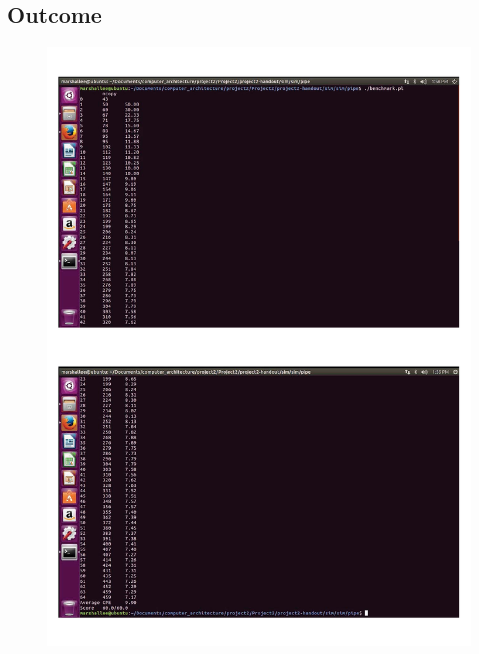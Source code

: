 \documentclass[12pt,a4paper]{article}
\theoremstyle{definition}
\numberwithin{equation}{section}
\numberwithin{figure}{section}
\begin{document}
\subsection{Outcome}
\begin{figure}[H]
	\centering
	\includegraphics[width=12cm]{ncopy_benchamrk.pdf}
\end{figure}
\end{document}
